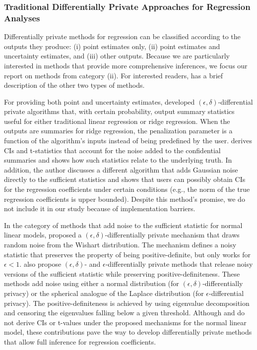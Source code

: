 \subsubsection{Traditional Differentially Private Approaches for Regression Analyses}\label{subsubsec:reg_rev}

Differentially private methods for regression can be classified according to the outputs they produce: (i) point estimates only, (ii) point estimates and uncertainty estimates, and (iii) other outputs. Because we are particularly interested in methods that provide more comprehensive inferences, we focus our report on methods from category (ii). For interested readers, \citet{barrientos2021} has a brief description of the other two types of methods.

For providing both point and uncertainty estimates, \citet{sheffet2017differentially} developed $(\epsilon,\delta)$-differential private algorithms that, with certain probability, output summary statistics useful for either traditional linear regression or ridge regression. When the outputs are summaries for ridge regression, the penalization parameter is a function of the algorithm's inputs instead of being predefined by the user. \citet{sheffet2017differentially} derives CIs and t-statistics that account for the noise added to the confidential summaries and shows how such statistics relate to the underlying truth. In addition, the author discusses a different algorithm that adds Gaussian noise directly to the sufficient statistics and shows that users can possibly obtain CIs for the regression coefficients under certain conditions (e.g., the norm of the true regression coefficients is upper bounded). Despite this method's promise, we do not include it in our study because of implementation barriers.

In the category of methods that add noise to the sufficient statistic for normal linear models, \citet{sheffet2019old} proposed a $(\epsilon,\delta)$-differentially private mechanism that draws random noise from the Wishart distribution. The mechanism defines a noisy statistic that preserves the property of being positive-definite, but only works for $\epsilon<1$. \citet{wang2019differentially} also propose $(\epsilon,\delta)$- and $\epsilon$-differentially private methods that release noisy versions of the sufficient statistic while preserving positive-definiteness. These methods add noise using either a normal distribution (for $(\epsilon,\delta)$-differentially privacy) or the spherical analogue of the Laplace distribution (for $\epsilon$-differential privacy). The positive-definiteness is achieved by using eigenvalue decomposition and censoring the eigenvalues falling below a given threshold. Although \citet{sheffet2019old} and \citet{wang2019differentially} do not derive CIs or t-values under the proposed mechanisms for the normal linear model, these contributions pave the way to develop differentially private methods that allow full inference for regression coefficients.  

